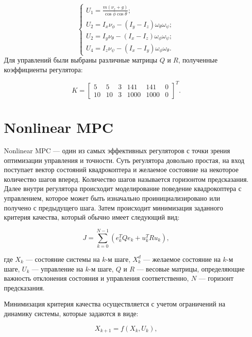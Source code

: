 \begin{equation}
    \begin{cases}
    U_1 = \frac{m (\nu_z + g)}{\cos\bar{\phi} \cos\bar{\theta}}; \\
    U_2 = I_x \nu_\phi - (I_y - I_z) \omega_\theta \omega_\psi; \\
    U_2 = I_y \nu_\theta - (I_x - I_z) \omega_\phi \omega_\psi; \\
    U_4 = I_z \nu_\psi - (I_x - I_y) \omega_\phi \omega_\theta.
    \end{cases}
\end{equation}
Для управлений были выбраны различные матрицы \(Q\) и \(R\), полученные коэффициенты регулятора:

\[
K = \begin{bmatrix}
    5  & 5  &  3  & 141 & 141 & 0 \\
    10 & 10 &  3  & 1000 & 1000 & 0 
\end{bmatrix}^T.
\]


\section{Nonlinear MPC}

Nonlinear MPC --- один из самых эффективных регуляторов с точки зрения оптимизации управления и 
точности. Суть регулятора довольно простая, на вход поступает вектор состояний квадрокоптера 
и желаемое состояние на некоторое количество 
шагов вперед. Количество шагов называется горизонтом предсказания. Далее 
внутри регулятора происходит моделирование поведение квадрокоптера с управлением, которое может быть
изначально проинициализировано или получено с предыдущего шага.
Затем происходит минимизация заданного критерия качества, который обычно имеет следующий вид:

\begin{equation}
    J = \sum_{k=0}^{N-1} \left( e_k^T Q e_k + u_k^T R u_k \right),
\end{equation}

где \(X_k\) — состояние системы на \(k\)-м шаге, \(X_k^d\) — желаемое состояние на \(k\)-м шаге, \(U_k\) — управление на \(k\)-м шаге, \(Q\) и \(R\) — весовые матрицы, определяющие важность отклонения состояния и управления соответственно, \(N\) — горизонт предсказания.

Минимизация критерия качества осуществляется с учетом ограничений на динамику системы, которые задаются в виде:

\begin{equation}
    X_{k+1} = f(X_k, U_k),
\end{equation}

